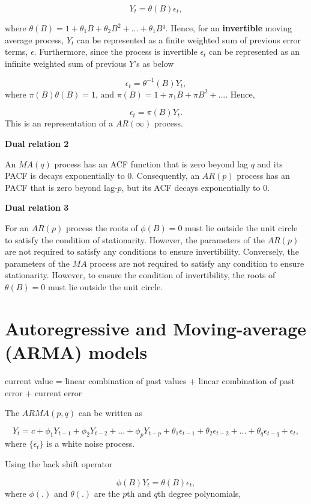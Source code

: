 \documentclass[
  11pt,
  a4paper,
]{report}
\begin{document}
\[Y_t = \theta(B)\epsilon_t,\]

where \(\theta(B)=1+\theta_1B+\theta_2B^2+...+\theta_1B^q.\) Hence, for
an \textbf{invertible} moving average process, \(Y_t\) can be
represented as a finite weighted sum of previous error terms,
\(\epsilon\). Furthermore, since the process is invertible
\(\epsilon_t\) can be represented as an infinite weighted sum of
previous \(Y\)'s as below

\[\epsilon_t=\theta^{-1}(B)Y_t,\] where \(\pi(B)\theta(B)=1\), and
\(\pi(B) = 1+\pi_1B+\pi B^2+...\). Hence,

\[\epsilon_t = \pi(B)Y_t.\] This is an representation of a
\(AR(\infty)\) process.

\textbf{Dual relation 2}

An \(MA(q)\) process has an ACF function that is zero beyond lag \(q\)
and its PACF is decays exponentially to 0. Consequently, an \(AR(p)\)
process has an PACF that is zero beyond lag-\(p\), but its ACF decays
exponentially to 0.

\textbf{Dual relation 3}

For an \(AR(p)\) process the roots of \(\phi(B)=0\) must lie outside the
unit circle to satisfy the condition of stationarity. However, the
parameters of the \(AR(p)\) are not required to satisfy any conditions
to ensure invertibility. Conversely, the parameters of the \(MA\)
process are not required to satisfy any condition to ensure
stationarity. However, to ensure the condition of invertibility, the
roots of \(\theta(B)=0\) must lie outside the unit circle.

\section{Autoregressive and Moving-average (ARMA)
models}\label{autoregressive-and-moving-average-arma-models}

current value = linear combination of past values + linear combination
of past error + current error

The \(ARMA(p, q)\) can be written as

\[Y_t=c+\phi_1 Y_{t-1}+\phi_2 Y_{t-2}+...+\phi_p Y_{t-p}+\theta_1\epsilon_{t-1}+\theta_2\epsilon_{t-2}+...+\theta_q\epsilon_{t-q}+\epsilon_t,\]
where \(\{\epsilon_t\}\) is a white noise process.

Using the back shift operator

\[\phi(B)Y_t=\theta(B)\epsilon_t,\] where \(\phi(.)\) and \(\theta(.)\)
are the \(p\)th and \(q\)th degree polynomials,
\end{document}
